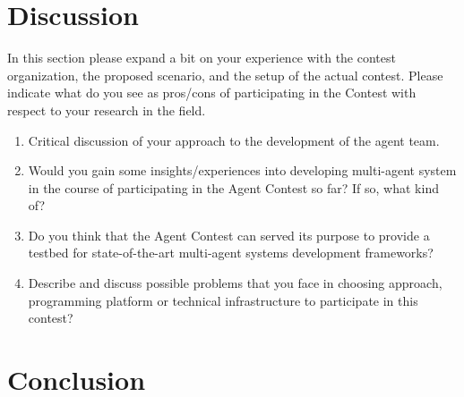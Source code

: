 \documentclass{llncs}
\begin{document}
\section{Discussion}
In this section please expand a bit on your experience with the
contest organization, the proposed scenario, and the setup of the
actual contest. Please indicate what do you see as pros/cons of
participating in the Contest with respect to your research in the
field.
\begin{enumerate}
    \item Critical discussion of your approach to the development of the
        agent team.
    \item Would you gain some insights/experiences into developing multi-agent system in
        the course of participating in the Agent Contest so far? If so,
        what kind of?
    \item Do you think that the Agent Contest can served its
        purpose to provide a testbed for state-of-the-art multi-agent
        systems development frameworks?
    \item Describe and discuss possible problems that you face in choosing approach, programming
        platform or technical infrastructure to participate in this contest?
\end{enumerate}


\section{Conclusion}
\end{document}

